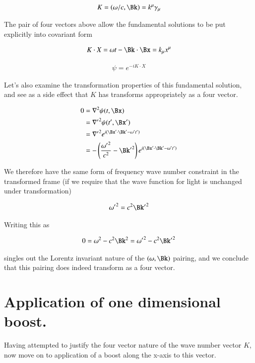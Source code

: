 \documentclass{article}
\begin{document}
\begin{align}
K = (\omega/c, \Bk) = k^\mu \gamma_\mu
\end{align}

The pair of four vectors above allow the fundamental solutions to be put explicitly into covariant form

\begin{align}
K \cdot X = \omega t - \Bk \cdot \Bx = k_\mu x^\mu
\end{align}

\begin{align}
\psi = e^{-i K \cdot X}
\end{align}

Let's also examine the transformation properties of this fundamental solution, and see as a side effect that $K$
has transforms appropriately as a four vector.

\begin{align*}
0 &= \grad^2 \psi(t,\Bx) \\
&= {\grad'}^2 \psi(t',\Bx') \\
&= {\grad'}^2 e^{i(\Bx' \cdot \Bk' - \omega' t')} \\
&= -\left(\frac{{\omega'}^2}{c^2} - {\Bk'}^2 \right) e^{i(\Bx' \cdot \Bk' - \omega' t')} \\
\end{align*}

We therefore have the same form of frequency wave number constraint in the transformed frame (if we require that
the wave function for light is unchanged under transformation)

\begin{align}
{\omega'}^2 = c^2 {\Bk'}^2 
\end{align}

Writing this as

\begin{align}
0 = {\omega}^2 - c^2 {\Bk}^2 = {\omega'}^2 - c^2 {\Bk'}^2 
\end{align}

singles out the Lorentz invariant nature of the $(\omega, \Bk)$ pairing, and we conclude that this pairing 
does indeed transform as a four vector.

\section{Application of one dimensional boost.}

Having attempted to justify the four vector nature of the wave number vector $K$, now move on to application of a boost along the x-axis to this vector.
\end{document}
